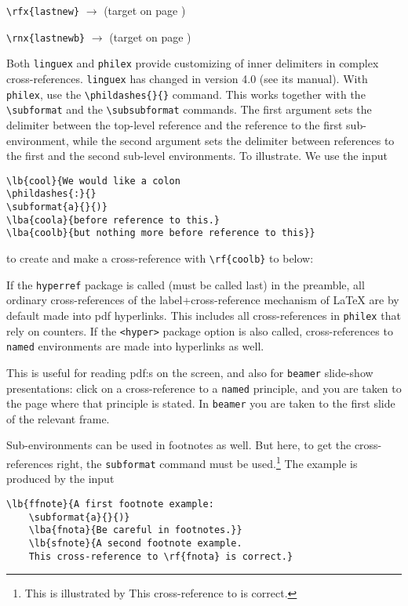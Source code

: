 \documentclass[11pt]{article}
\newcommand{\note}{\footnote}
\begin{document}
\begin{trivlist}
\item \verb+\rfx{lastnew}+ \(\longrightarrow\) \hfill (target on page \pageref{lastnew})
\item \verb+\rnx{lastnewb}+ \(\longrightarrow\)  \hfill (target on page \pageref{lastnewb})
\end{trivlist}
	
Both \verb+linguex+ and \verb+philex+  provide customizing of inner delimiters in complex cross-references. \verb+linguex+ has changed in version 4.0 (see its manual). With \verb+philex+, use the \verb+\phildashes{}{}+  command. This works together with the \verb+\subformat+ and the \verb+\subsubformat+ commands. The first argument sets the delimiter between the top-level reference and the reference to the first sub-environment, while the second argument sets the delimiter between references to the first and the second sub-level environments. To illustrate. We use the input
\begin{verbatim}
\lb{cool}{We would like a colon
\phildashes{:}{}
\subformat{a}{}{)}
\lba{coola}{before reference to this.}
\lba{coolb}{but nothing more before reference to this}}
\end{verbatim}
to create and make a cross-reference with \verb+\rf{coolb}+ to  below: 
	
If the \verb+hyperref+ package  is called (must be called last) in the preamble, all ordinary cross-references of the label+cross-reference mechanism of LaTeX are by default made into pdf hyperlinks. This includes all cross-references in \verb+philex+ that rely on counters. If the \verb+<hyper>+ package option is also called, cross-references to \verb+named+ environments are made into hyperlinks as well.

This is useful for reading pdf:s on the screen, and also for \verb+beamer+ slide-show presentations: click on a cross-reference to a \verb+named+ principle, and you are taken to the page where that principle is stated. In \verb+beamer+ you are taken to the first slide of the relevant frame.

Sub-environments can  be used in footnotes as well. But here, to get the cross-references right,  the \verb+subformat+ command must be used.\note
	{This is illustrated by
	This cross-reference to  is correct.}
	The example is produced by the input
\begin{verbatim}
\lb{ffnote}{A first footnote example:
	\subformat{a}{}{)}
	\lba{fnota}{Be careful in footnotes.}}
	\lb{sfnote}{A second footnote example.
	This cross-reference to \rf{fnota} is correct.}
\end{verbatim}
 
\end{document}
